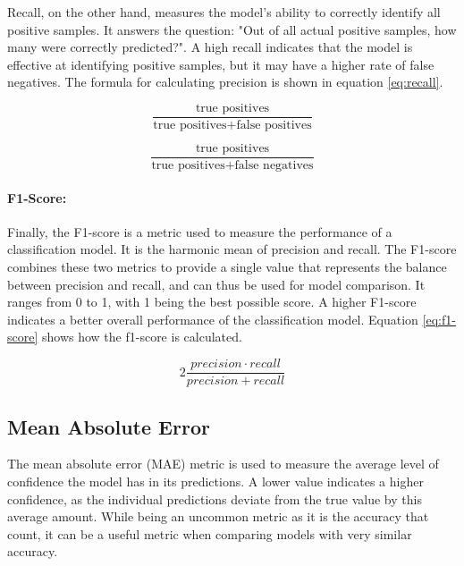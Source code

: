 Recall, on the other hand, measures the model's ability to correctly identify all positive samples. It answers the question: "Out of all actual positive samples, how many were correctly predicted?". A high recall indicates that the model is effective at identifying positive samples, but it may have a higher rate of false negatives. The formula for calculating precision is shown in equation \ref{eq:recall}.

\begin{minipage}{0.5\linewidth}
	\begin{equation}
		\frac{\text{true positives}}{\text{true positives} + \text{false positives}}
		\label{eq:precision}
	\end{equation}
\end{minipage}
\begin{minipage}{0.5\linewidth}
	\begin{equation}
		\frac{\text{true positives}}{\text{true positives} + \text{false negatives}}
		\label{eq:recall}
	\end{equation}
\end{minipage}

\paragraph{F1-Score:}
Finally, the F1-score is a metric used to measure the performance of a classification model. It is the harmonic mean of precision and recall. The F1-score combines these two metrics to provide a single value that represents the balance between precision and recall, and can thus be used for model comparison. It ranges from 0 to 1, with 1 being the best possible score. A higher F1-score indicates a better overall performance of the classification model. Equation \ref{eq:f1-score} shows how the f1-score is calculated.

\begin{equation}
	2 \frac{precision \cdot recall}{precision + recall}
	\label{eq:f1-score}
\end{equation}

\subsection{Mean Absolute Error}

The mean absolute error (MAE) metric is used to measure the average level of confidence the model has in its predictions. A lower value indicates a higher confidence, as the individual predictions deviate from the true value by this average amount. While being an uncommon metric as it is the accuracy that count, it can be a useful metric when comparing models with very similar accuracy.

